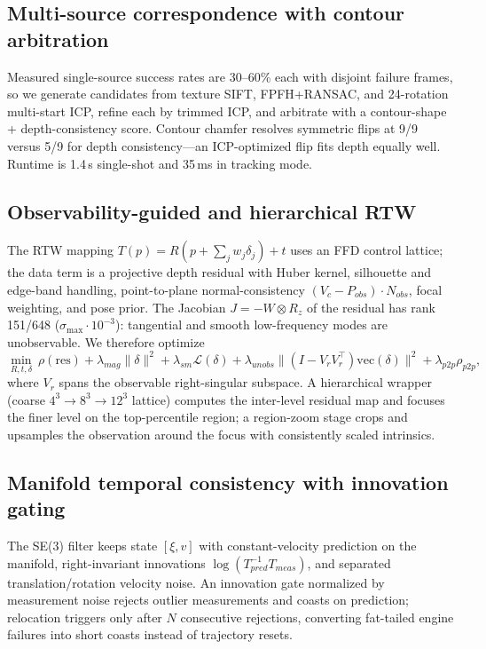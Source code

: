 \documentclass[journal]{IEEEtran}
\begin{document}
\subsection{Multi-source correspondence with contour arbitration}
Measured single-source success rates are 30--60\% each with disjoint failure frames, so we generate candidates from texture SIFT, FPFH+RANSAC, and 24-rotation multi-start ICP, refine each by trimmed ICP, and arbitrate with a contour-shape + depth-consistency score. Contour chamfer resolves symmetric flips at 9/9 versus 5/9 for depth consistency---an ICP-optimized flip fits depth equally well. Runtime is 1.4\,s single-shot and 35\,ms in tracking mode.

\subsection{Observability-guided and hierarchical RTW}
The RTW mapping $T(p)=R(p+\sum_j w_j\delta_j)+t$ uses an FFD control lattice; the data term is a projective depth residual with Huber kernel, silhouette and edge-band handling, point-to-plane normal-consistency $(V_c-P_{obs})\cdot N_{obs}$, focal weighting, and pose prior. The Jacobian $J=-W\otimes R_z$ of the residual has rank 151/648 ($\sigma_{\max}\cdot10^{-3}$): tangential and smooth low-frequency modes are unobservable. We therefore optimize
\begin{equation}
\min_{R,t,\delta}\ \rho(\mathrm{res})+\lambda_{mag}\|\delta\|^2+\lambda_{sm}\mathcal{L}(\delta)+\lambda_{unobs}\|(I-V_rV_r^\top)\mathrm{vec}(\delta)\|^2+\lambda_{p2p}\rho_{p2p},
\end{equation}
where $V_r$ spans the observable right-singular subspace. A hierarchical wrapper (coarse $4^3\to8^3\to12^3$ lattice) computes the inter-level residual map and focuses the finer level on the top-percentile region; a region-zoom stage crops and upsamples the observation around the focus with consistently scaled intrinsics.

\subsection{Manifold temporal consistency with innovation gating}
The SE(3) filter keeps state $[\xi,v]$ with constant-velocity prediction on the manifold, right-invariant innovations $\log(T_{pred}^{-1}T_{meas})$, and separated translation/rotation velocity noise. An innovation gate normalized by measurement noise rejects outlier measurements and coasts on prediction; relocation triggers only after $N$ consecutive rejections, converting fat-tailed engine failures into short coasts instead of trajectory resets.
\end{document}
